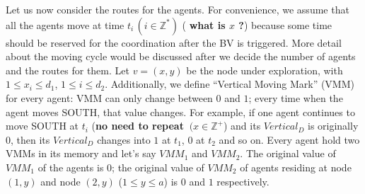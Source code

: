 Let us now consider the routes for the agents. For convenience, we assume that all the agents move at time $t_i\,(i\in\mathbb{Z}^*)$ ( {\bf what is $x$ ?}) because some time should be reserved for the coordination after the BV is triggered. More detail about the moving cycle would be discussed after we decide the number of agents and the routes for them. 
Let $v=(x, y)$ be the node under exploration, with $1\leq x_i \leq d_1$, $1\leq i \leq d_2$. Additionally, we define ``Vertical Moving Mark'' (VMM) for every agent: VMM can only change between $0$ and $1$; every time when the agent moves SOUTH, that value changes. For example, if one agent continues to move SOUTH at $t_i$ ({\bf no need to repeat $\,(x\in\mathbb{Z}^+$}) and its $Vertical_D$ is originally $0$, then its $Vertical_D$ changes into $1$ at $t_1$, $0$ at $t_2$ and so on.
Every agent hold two VMMs in its memory and let's say $VMM_1$ and $VMM_2$. The original value of $VMM_1$ of the agents is $0$; the original value of $VMM_2$ of agents residing at node $(1, y)$ and node $(2, y)$ ($1\leq y\leq a$) is $0$ and $1$ respectively. 

